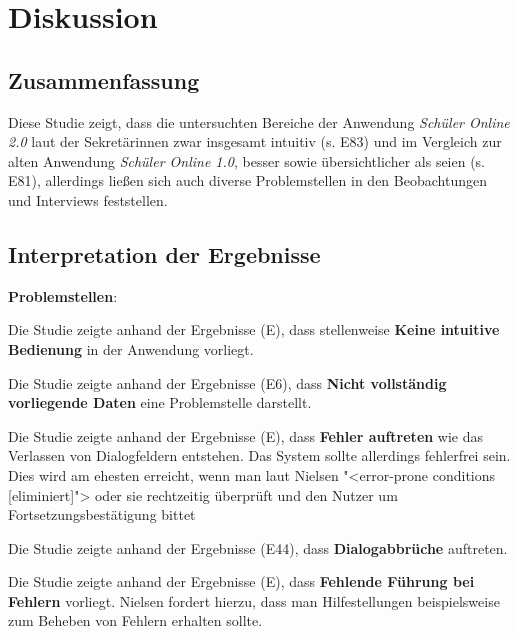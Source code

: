 \section{Diskussion}

\subsection{Zusammenfassung}
Diese Studie zeigt, dass die untersuchten Bereiche der Anwendung \textit{Schüler Online 2.0} laut der Sekretärinnen zwar insgesamt intuitiv (s. E83) und im Vergleich zur alten Anwendung \textit{Schüler Online 1.0}, \glqq besser\grqq{} sowie \glqq übersichtlicher \grqq{} als seien (s. E81), allerdings ließen sich auch diverse Problemstellen in den Beobachtungen und Interviews feststellen. 

%

\subsection{Interpretation der Ergebnisse}

\textbf{Problemstellen}:

Die Studie zeigte anhand der Ergebnisse (E), dass stellenweise \textbf{Keine intuitive Bedienung} in der Anwendung vorliegt. 

Die Studie zeigte anhand der Ergebnisse (E6), dass \textbf{Nicht vollständig vorliegende Daten} eine Problemstelle darstellt. 

Die Studie zeigte anhand der Ergebnisse (E), dass \textbf{Fehler auftreten}  wie das Verlassen von Dialogfeldern entstehen. Das System sollte allerdings fehlerfrei sein. Dies wird am ehesten erreicht, wenn man laut Nielsen "<error-prone conditions [eliminiert]"> oder sie rechtzeitig überprüft und den Nutzer um Fortsetzungsbestätigung bittet \cite{Nielsen10}

Die Studie zeigte anhand der Ergebnisse (E44), dass \textbf{Dialogabbrüche} auftreten.

Die Studie zeigte anhand der Ergebnisse (E), dass \textbf{Fehlende Führung bei Fehlern} vorliegt. Nielsen fordert hierzu, dass man Hilfestellungen beispielsweise zum Beheben von Fehlern erhalten sollte. \cite{Nielsen10}

